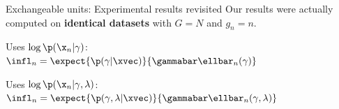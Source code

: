 \begin{frame}{Exchangeable units: Experimental results revisited}
    Our results were actually computed on \textbf{identical datasets}
    with $G = N$ and $g_n=n$.

    \begin{center}
    \begin{minipage}{0.34\textwidth}
        Uses $\log \p(\x_n \vert \gamma)$:\\
        $\infl_n = \expect{\p(\gamma \vert \xvec)}{\gammabar \ellbar_n(\gamma)}$

    \end{minipage}
    \begin{minipage}{0.65\textwidth}
        \LowDimAccuracyGraph{}
    \end{minipage}

    \begin{minipage}{0.34\textwidth}
        Uses $\log \p(\x_n \vert \gamma, \lambda)$:\\
        $\infl_n = \expect{\p(\gamma,\lambda \vert \xvec)}{\gammabar \ellbar_n(\gamma, \lambda)}$



    \end{minipage}
    \begin{minipage}{0.65\textwidth}
        \HighDimAccuracyGraph{}
    \end{minipage}
\end{center}
\end{frame}






